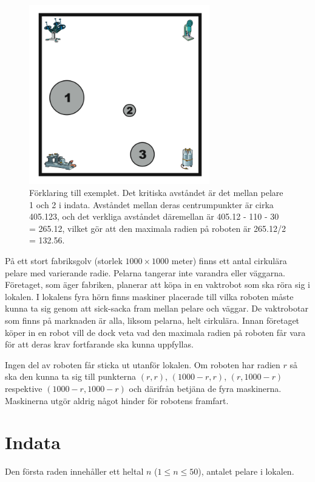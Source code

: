 

\begin{figure}[ht!]
\centering
\includegraphics[width=0.7\textwidth]{fabriksrobot.png}
\caption{Förklaring till exemplet. Det kritiska avståndet är det mellan pelare 1 och 2 i indata. Avståndet mellan deras centrumpunkter är cirka 405.123, och det verkliga avståndet däremellan är 405.12 - 110 - 30 = 265.12, vilket gör att den maximala radien på roboten är 265.12/2 = 132.56.}
\label{overflow}
\end{figure}

På ett stort fabriksgolv (storlek $1000 \times 1000$ meter) finns ett antal cirkulära pelare med varierande radie. Pelarna tangerar inte varandra eller väggarna. Företaget, som äger fabriken, planerar att köpa in en vaktrobot som ska röra sig i lokalen. I lokalens fyra hörn finns maskiner placerade till vilka roboten måste kunna ta sig genom att sick-sacka fram mellan pelare och väggar. De vaktrobotar som finns på marknaden är alla, liksom pelarna, helt cirkulära. Innan företaget köper in en robot vill de dock veta vad den maximala radien på roboten får vara för att deras krav fortfarande ska kunna uppfyllas.

Ingen del av roboten får sticka ut utanför lokalen. Om roboten har radien $r$ så ska den kunna ta sig till punkterna $(r, r)$, $(1000 - r, r)$, $(r, 1000 - r)$ respektive $(1000 - r, 1000 - r)$ och därifrån betjäna de fyra maskinerna. Maskinerna utgör aldrig något hinder för robotens framfart.

\section*{Indata}
Den första raden innehåller ett heltal $n$ ($1 \le n \le 50$), antalet pelare i lokalen.

